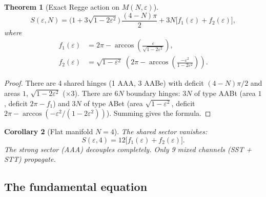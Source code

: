 \documentclass[12pt]{article}
\newtheorem{theorem}{Theorem}[section]
\newtheorem{corollary}[theorem]{Corollary}
\theoremstyle{remark}
\theoremstyle{definition}
\begin{document}
\begin{theorem}[Exact Regge action on $M(N,\varepsilon)$]
\label{thm:closed_action}
\begin{equation}
\boxed{S(\varepsilon,N) = \bigl(1 + 3\sqrt{1-2\varepsilon^2}\bigr)\,\frac{(4-N)\pi}{2} + 3N\bigl[f_1(\varepsilon) + f_2(\varepsilon)\bigr],}
\end{equation}
where
\begin{align}
f_1(\varepsilon) &= 2\pi - \arccos\!\left(\frac{\varepsilon}{\sqrt{1-2\varepsilon^2}}\right), \\[4pt]
f_2(\varepsilon) &= \sqrt{1-\varepsilon^2}\;\left(2\pi - \arccos\!\left(\frac{-\varepsilon^2}{1-2\varepsilon^2}\right)\right).
\end{align}
\end{theorem}
\begin{proof}
There are 4 shared hinges (1 AAA, 3 AABe) with deficit $(4\!-\!N)\pi/2$ and areas $1$, $\sqrt{1\!-\!2\varepsilon^2}$ ($\times 3$).  There are $6N$ boundary hinges: $3N$ of type AABt (area $1$, deficit $2\pi\!-\!f_1$) and $3N$ of type ABet (area $\sqrt{1\!-\!\varepsilon^2}$, deficit $2\pi\!-\!\arccos(-\varepsilon^2/(1\!-\!2\varepsilon^2))$).  Summing gives the formula.
\end{proof}

\begin{corollary}[Flat manifold $N=4$]
\label{cor:flat_action}
The shared sector vanishes:
\begin{equation}
S(\varepsilon, 4) = 12\bigl[f_1(\varepsilon) + f_2(\varepsilon)\bigr].
\end{equation}
The strong sector (AAA) decouples completely.  Only 9 mixed channels (SST + STT) propagate.
\end{corollary}

\subsection{The fundamental equation}
\label{sec:fundamental_eq}
\end{document}
